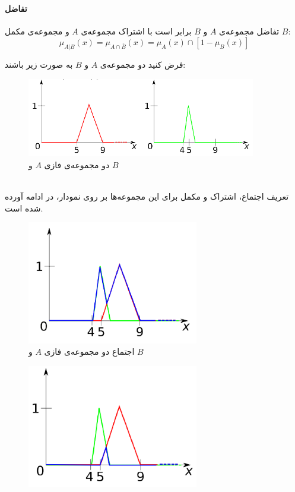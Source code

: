  \paragraph{تفاضل}
 تفاضل مجموعه‌ی $A$ و $B$ برابر است با اشتراک مجموعه‌ی $A$ و مجموعه‌ی مکمل $B$:
 \begin{equation}\label{eq:e_fset_op_difference}
 \mu_{A|B}(x) = \mu_{A \cap \overline{B}}(x) = \mu_{A}(x) \cap [ 1 - \mu_{B}(x)]
 \end{equation}
\begin{exmp}
	فرض کنید دو مجموعه‌ی $A$ و $B$ به صورت زیر باشند:
\begin{figure}[h]
	\centering 
	\includegraphics[width=100mm]{Images/Fig8.png}
	\vspace{-0.5cm}
	\caption{دو مجموعه‌ی فازی $ A $ و $ B $} \label{fig:f_fset_op_exmp}
\end{figure}\\
تعریف اجتماع، اشتراک و مکمل برای این مجموعه‌ها بر روی نمودار، در ادامه آورده شده است. 
\begin{figure}[h]
	\centering 
	\includegraphics[width=75mm]{Images/Fig9.png}
	\vspace{-0.5cm}
	\caption{اجتماع دو مجموعه‌ی فازی $ A $ و $ B $} \label{fig:f_fset_op_exmp_union}
\end{figure}
\begin{figure}[h]
	\centering 
	\includegraphics[width=75mm]{Images/Fig10.png}

\end{figure}
\end{exmp}

